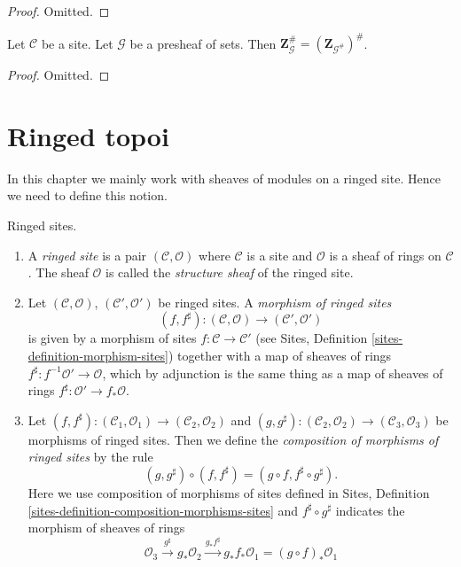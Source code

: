 \begin{proof}
Omitted.
\end{proof}

\begin{lemma}
\label{lemma-may-sheafify-before-abelianize}
Let $\mathcal{C}$ be a site.
Let $\mathcal{G}$ be a presheaf of sets.
Then $\mathbf{Z}_{\mathcal{G}}^\# = (\mathbf{Z}_{\mathcal{G}^\#})^\#$.
\end{lemma}

\begin{proof}
Omitted.
\end{proof}








\section{Ringed topoi}
\label{section-ringed-topoi}

\noindent
In this chapter we mainly work with sheaves of modules on a ringed site.
Hence we need to define this notion.

\begin{definition}
\label{definition-ringed-site}
Ringed sites.
\begin{enumerate}
\item A {\it ringed site} is a pair $(\mathcal{C}, \mathcal{O})$
where $\mathcal{C}$ is a site and $\mathcal{O}$ is a sheaf of rings
on $\mathcal{C}$. The sheaf $\mathcal{O}$ is called the
{\it structure sheaf} of the ringed site.
\item Let $(\mathcal{C}, \mathcal{O})$, $(\mathcal{C}', \mathcal{O}')$ be ringed
sites. A {\it morphism of ringed sites}
$$
(f, f^\sharp) :
(\mathcal{C}, \mathcal{O})
\longrightarrow
(\mathcal{C}', \mathcal{O}')
$$
is given by a morphism of sites $f : \mathcal{C} \to \mathcal{C}'$
(see Sites, Definition \ref{sites-definition-morphism-sites})
together with a map of sheaves of rings
$f^\sharp : f^{-1}\mathcal{O}' \to \mathcal{O}$, which by adjunction
is the same thing as a map of sheaves of rings
$f^\sharp : \mathcal{O}' \to f_*\mathcal{O}$.
\item Let
$(f, f^\sharp) :
(\mathcal{C}_1, \mathcal{O}_1) \to (\mathcal{C}_2, \mathcal{O}_2)$ and
$(g, g^\sharp) :
(\mathcal{C}_2, \mathcal{O}_2) \to (\mathcal{C}_3, \mathcal{O}_3)$
be morphisms of ringed sites. Then we define
the {\it composition of morphisms of ringed sites}
by the rule
$$
(g, g^\sharp) \circ (f, f^\sharp) = (g \circ f, f^\sharp \circ g^\sharp).
$$
Here we use composition of morphisms of sites defined in
Sites, Definition \ref{sites-definition-composition-morphisms-sites}
and $f^\sharp \circ g^\sharp$ indicates the morphism of sheaves of
rings
$$
\mathcal{O}_3 \xrightarrow{g^\sharp} g_*\mathcal{O}_2
\xrightarrow{g_*f^\sharp} g_*f_*\mathcal{O}_1 = (g \circ f)_*\mathcal{O}_1
$$
\end{enumerate}
\end{definition}

